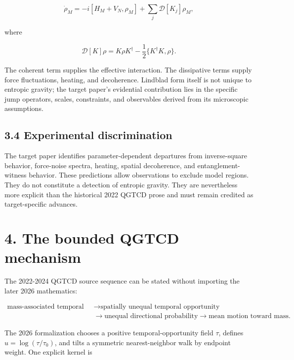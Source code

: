 \documentclass[
  american,
  11pt,
  letterpaper,
]{article}
\begin{document}
\begin{equation}
\dot\rho_M=-i[H_M+V_N,\rho_M]
+\sum_j \mathcal{D}[K_j]\rho_M,
\tag{3}
\end{equation}

where

\begin{equation}
\mathcal{D}[K]\rho=K\rho K^\dagger-
\frac{1}{2}\{K^\dagger K,\rho\}.
\tag{4}
\end{equation}

The coherent term supplies the effective interaction. The dissipative terms supply force fluctuations, heating, and decoherence. Lindblad form itself is not unique to entropic gravity; the target paper's evidential contribution lies in the specific jump operators, scales, constraints, and observables derived from its microscopic assumptions.

\subsection{3.4 Experimental discrimination}\label{experimental-discrimination}

The target paper identifies parameter-dependent departures from inverse-square behavior, force-noise spectra, heating, spatial decoherence, and entanglement-witness behavior. These predictions allow observations to exclude model regions. They do not constitute a detection of entropic gravity. They are nevertheless more explicit than the historical 2022 QGTCD prose and must remain credited as target-specific advances.

\section{4. The bounded QGTCD mechanism}\label{the-bounded-qgtcd-mechanism}

The 2022-2024 QGTCD source sequence can be stated without importing the later 2026 mathematics:

\[
\begin{aligned}
\text{mass-associated temporal structure}
&\longrightarrow
\text{spatially unequal temporal opportunity}\\
&\longrightarrow
\text{unequal directional probability}
\longrightarrow
\text{mean motion toward mass}.
\end{aligned}
\tag{5}
\]

The 2026 formalization chooses a positive temporal-opportunity field \(\tau\), defines \(u=\log(\tau/\tau_0)\), and tilts a symmetric nearest-neighbor walk by endpoint weight. One explicit kernel is
\end{document}
